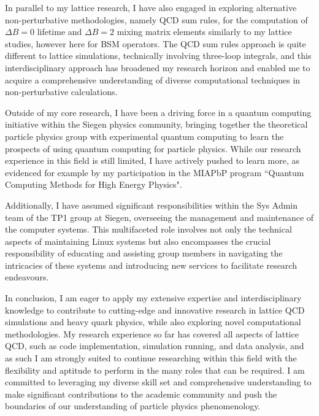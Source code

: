 \documentclass[11pt, a4paper]{awesome-cv}
\begin{document}
\begin{cvletter}
In parallel to my lattice research, I have also engaged in exploring alternative non-perturbative methodologies, namely QCD sum rules, for the computation of $\Delta B=0$ lifetime and $\Delta B=2$ mixing matrix elements similarly to my lattice studies, however here for BSM operators.
The QCD sum rules approach is quite different to lattice simulations, technically involving three-loop integrals, and this interdisciplinary approach has broadened my research horizon and enabled me to acquire a comprehensive understanding of diverse computational techniques in non-perturbative calculations.

\pagebreak
Outside of my core research, I have been a driving force in a quantum computing initiative within the Siegen physics community, bringing together the theoretical particle physics group with experimental quantum computing to learn the prospects of using quantum computing for particle physics. 
While our research experience in this field is still limited, I have actively pushed to learn more, as evidenced for example by my participation in the MIAPbP program ``Quantum Computing Methods for High Energy Physics".

Additionally, I have assumed significant responsibilities within the Sys Admin team of the TP1 group at Siegen, overseeing the management and maintenance of the computer systems. 
This multifaceted role involves not only the technical aspects of maintaining Linux systems but also encompasses the crucial responsibility of educating and assisting group members in navigating the intricacies of these systems and introducing new services to facilitate research endeavours.

In conclusion, I am eager to apply my extensive expertise and interdisciplinary knowledge to contribute to cutting-edge and innovative research in lattice QCD simulations and heavy quark physics, while also exploring novel computational methodologies. 
My research experience so far has covered all aspects of lattice QCD, such as code implementation, simulation running, and data analysis, and as such I am strongly suited to continue researching within this field with the flexibility and aptitude to perform in the many roles that can be required.
I am committed to leveraging my diverse skill set and comprehensive understanding to make significant contributions to the academic community and push the boundaries of our understanding of particle physics phenomenology.

\end{cvletter}

\makeletterclosing
\end{document}
